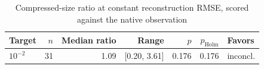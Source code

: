 \begin{table}[t]
\centering
\caption{Compressed-size ratio at constant reconstruction RMSE, scored against the native observation}
\label{tab:storage_at_rmse_common}
\footnotesize
\setlength{\tabcolsep}{3pt}
\begin{tabular}{lrrrrrl}
\toprule
Target & $n$ & Median ratio & Range & $p$ & $p_{\mathrm{Holm}}$ & Favors \\
\midrule
$10^{-2}$ & 31 & 1.09 & [0.20, 3.61] & 0.176 & 0.176 & inconcl. \\
\bottomrule
\end{tabular}
\end{table}

